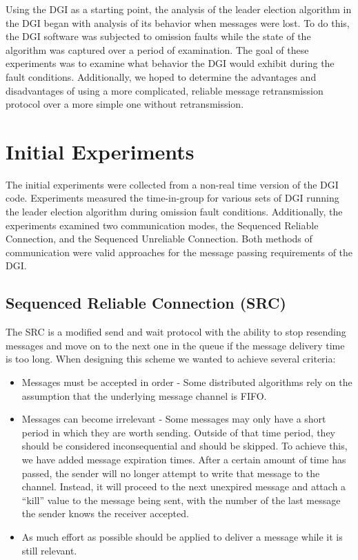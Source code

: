 Using the DGI as a starting point, the analysis of the leader election algorithm in the DGI began with analysis of its behavior when messages were lost.
To do this, the DGI software was subjected to omission faults while the state of the algorithm was captured over a period of examination.
The goal of these experiments was to examine what behavior the DGI would exhibit during the fault conditions.
Additionally, we hoped to determine the advantages and disadvantages of using a more complicated, reliable message retransmission protocol over a more simple one without retransmission.

\section{Initial Experiments}

The initial experiments were collected from a non-real time version of the DGI code.
Experiments measured the time-in-group for various sets of DGI running the leader election algorithm during omission fault conditions.
Additionally, the experiments examined two communication modes, the Sequenced Reliable Connection, and the Sequenced Unreliable Connection.
Both methods of communication were valid approaches for the message passing requirements of the DGI.

\subsection{Sequenced Reliable Connection (SRC)}

The \ac{SRC} is a modified send and wait protocol with the ability to stop resending messages and move on to the next one in the queue if the message delivery time is too long. When designing this scheme we wanted to achieve several criteria:

\begin{itemize}
\item Messages must be accepted in order - Some distributed algorithms rely on the assumption that the underlying message channel is FIFO.
\item Messages can become irrelevant - Some messages may only have a short period in which they are worth sending. Outside of that time period, they should be considered inconsequential and should be skipped. To achieve this, we have added message expiration times. After a certain amount of time has passed, the sender will no longer attempt to write that message to the channel. Instead, it will proceed to the next unexpired message and attach a ``kill'' value to the message being sent, with the number of the last message the sender knows the receiver accepted.
\item As much effort as possible should be applied to deliver a message while it is still relevant.
\end{itemize}

